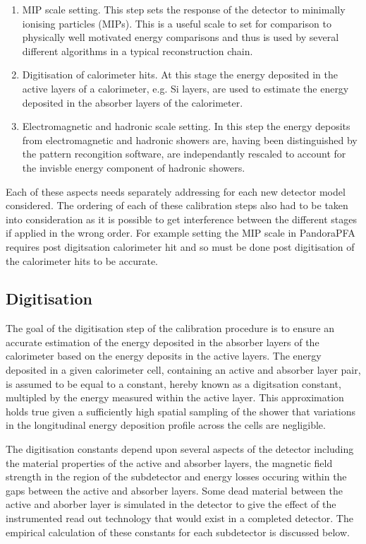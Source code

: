 \begin{enumerate}
\item MIP scale setting.  This step sets the response of the detector to minimally ionising particles (MIPs).  This is a useful scale to set for comparison to physically well motivated energy comparisons and thus is used by several different algorithms in a typical reconstruction chain. 
\item Digitisation of calorimeter hits.  At this stage the energy deposited in the active layers of a calorimeter, e.g. Si layers, are used to estimate the energy deposited in the absorber layers of the calorimeter.  
\item Electromagnetic and hadronic scale setting.  In this step the energy deposits from electromagnetic and hadronic showers are, having been distinguished by the pattern recongition software, are independantly rescaled to account for the invisble energy component of hadronic showers.  
\end{enumerate}

Each of these aspects needs separately addressing for each new detector model considered.  The ordering of each of these calibration steps also had to be taken into consideration as it is possible to get interference between the different stages if applied in the wrong order.  For example setting the MIP scale in PandoraPFA requires post digitsation calorimeter hit and so must be done post digitisation of the calorimeter hits to be accurate.

\subsection{Digitisation}
The goal of the digitisation step of the calibration procedure is to ensure an accurate estimation of the energy deposited in the absorber layers of the calorimeter based on the energy deposits in the active layers.  The energy deposited in a given calorimeter cell, containing an active and absorber layer pair, is assumed to be equal to a constant, hereby known as a digitsation constant, multipled by the energy measured within the active layer.  This approximation holds true given a sufficiently high spatial sampling of the shower that variations in the longitudinal energy deposition profile across the cells are negligible.  

The digitisation constants depend upon several aspects of the detector including the material properties of the active and absorber layers, the magnetic field strength in the region of the subdetector and energy losses occuring within the gaps between the active and absorber layers.  Some dead material between the active and aborber layer is simulated in the detector to give the effect of the instrumented read out technology that would exist in a completed detector.  The empirical calculation of these constants for each subdetector is discussed below. 

